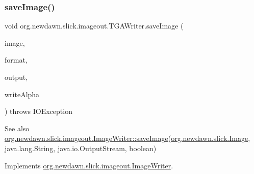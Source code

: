 \subsubsection{\texorpdfstring{save\+Image()}{saveImage()}}
{\footnotesize\ttfamily void org.\+newdawn.\+slick.\+imageout.\+T\+G\+A\+Writer.\+save\+Image (\begin{DoxyParamCaption}\item[{\mbox{\hyperlink{classorg_1_1newdawn_1_1slick_1_1_image}{Image}}}]{image,  }\item[{String}]{format,  }\item[{Output\+Stream}]{output,  }\item[{boolean}]{write\+Alpha }\end{DoxyParamCaption}) throws I\+O\+Exception\hspace{0.3cm}{\ttfamily [inline]}}

\begin{DoxySeeAlso}{See also}
\mbox{\hyperlink{interfaceorg_1_1newdawn_1_1slick_1_1imageout_1_1_image_writer_ad911f19d2f2c9e9925c73510018423b9}{org.\+newdawn.\+slick.\+imageout.\+Image\+Writer\+::save\+Image}}(\mbox{\hyperlink{classorg_1_1newdawn_1_1slick_1_1_image}{org.\+newdawn.\+slick.\+Image}}, java.\+lang.\+String, java.\+io.\+Output\+Stream, boolean) 
\end{DoxySeeAlso}


Implements \mbox{\hyperlink{interfaceorg_1_1newdawn_1_1slick_1_1imageout_1_1_image_writer_ad911f19d2f2c9e9925c73510018423b9}{org.\+newdawn.\+slick.\+imageout.\+Image\+Writer}}.


